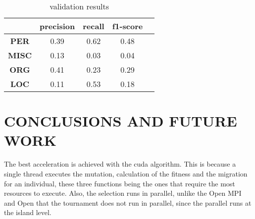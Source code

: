 \documentclass{IEEEtran}
\begin{document}

\begin{table}[ht]
  \centering
  \begin{tabular}{|c|c|c|c|c|}
    \hline
    \textbf{}     & \textbf{precision} & \textbf{recall} & \textbf{f1-score} \\ \hline
    \textbf{PER}  & 0.39               & 0.62            & 0.48              \\
    \textbf{MISC} & 0.13               & 0.03            & 0.04              \\
    \textbf{ORG}  & 0.41               & 0.23            & 0.29              \\
    \textbf{LOC}  & 0.11               & 0.53            & 0.18              \\ \hline
  \end{tabular}
  \caption{validation results}
  \label{tab:results_validation}
\end{table}





\section{CONCLUSIONS AND FUTURE WORK}

The best acceleration is achieved with the cuda algorithm. This is because a single thread executes the mutation, calculation of the fitness and the migration for an individual, these three functions being the ones that require the most resources to execute. Also, the selection runs in parallel, unlike the Open MPI and Open that the tournament does not run in parallel, since the parallel runs at the island level.
\end{document}
